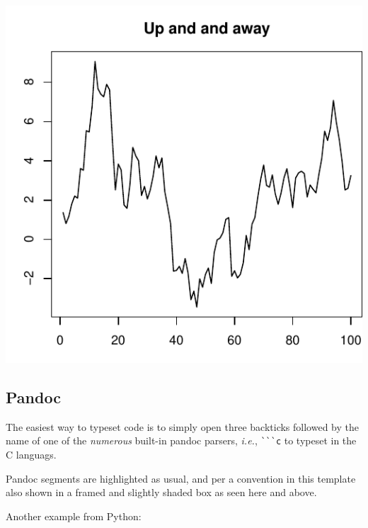 \documentclass[letterpaper,9pt,twocolumn,twoside,]{pinp}
\begin{document}
\begin{center}\includegraphics{pinp_files/figure-latex/unnamed-chunk-2-1} \end{center}

\hypertarget{pandoc}{%
\subsection{Pandoc}\label{pandoc}}

The easiest way to typeset code is to simply open three backticks
followed by the name of one of the \emph{numerous} built-in pandoc
parsers, \emph{i.e.}, \verb|```c| to typeset in the C languags.

\begin{Shaded}
\begin{Highlighting}[]
\NormalTok{\}}
\end{Highlighting}
\end{Shaded}

Pandoc segments are highlighted as usual, and per a convention in this
template also shown in a framed and slightly shaded box as seen here and
above.

Another example from Python:
\end{document}
